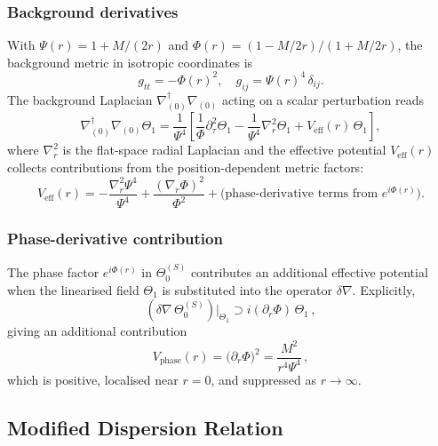 \documentclass[12pt]{article}
\theoremstyle{definition}
\theoremstyle{remark}
\begin{document}
\subsubsection{Background derivatives}

With $\Psi(r) = 1 + M/(2r)$ and $\Phi(r) = (1-M/2r)/(1+M/2r)$,
the background metric in isotropic coordinates is
\begin{equation}
  g_{tt} = -\Phi(r)^2,\quad
  g_{ij} = \Psi(r)^4\,\delta_{ij}.
  \label{eq:schw_metric_isotropic}
\end{equation}
The background Laplacian $\nabla_{(0)}^\dagger\nabla_{(0)}$ acting on a scalar
perturbation reads
\begin{equation}
  \nabla_{(0)}^\dagger\nabla_{(0)}\Theta_1
  = \frac{1}{\Psi^4}\left[
      \frac{1}{\Phi}\partial_\tau^2\Theta_1
      - \frac{1}{\Psi^4}\nabla_r^2\Theta_1
      + V_{\text{eff}}(r)\,\Theta_1
    \right],
  \label{eq:box_schw}
\end{equation}
where $\nabla_r^2$ is the flat-space radial Laplacian and the effective
potential $V_{\text{eff}}(r)$ collects contributions from the
position-dependent metric factors:
\begin{equation}
  V_{\text{eff}}(r) = -\frac{\nabla_r^2\Psi^4}{\Psi^4}
    + \frac{(\nabla_r\Phi)^2}{\Phi^2}
    + \text{(phase-derivative terms from }e^{i\Phi(r)}\text{)}.
  \label{eq:Veff_general}
\end{equation}

\subsubsection{Phase-derivative contribution}

The phase factor $e^{i\Phi(r)}$ in $\Theta_0^{(S)}$ contributes an
additional effective potential when the linearised field $\Theta_1$
is substituted into the operator $\delta\nabla$. Explicitly,
\begin{equation}
  (\delta\nabla\,\Theta_0^{(S)})\big|_{\Theta_1}
  \supset i(\partial_r\Phi)\,\Theta_1\,,
\end{equation}
giving an additional contribution
\begin{equation}
  V_{\text{phase}}(r) = \bigl(\partial_r\Phi\bigr)^2
    = \frac{M^2}{r^4\Psi^4}\,,
  \label{eq:Vphase}
\end{equation}
which is positive, localised near $r=0$, and suppressed as $r\to\infty$.

\subsection{Modified Dispersion Relation}
\end{document}
